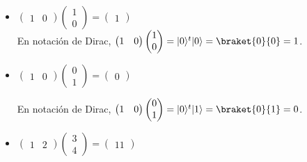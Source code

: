 \documentclass[osajnl,preprint,showpacs,superscriptaddress,10pt]{revtex4-1} %
\DeclarePairedDelimiter\ket{\lvert}{\rangle}
\begin{document}
\begin{itemize}

    \item $\begin{pmatrix}1 & 0\end{pmatrix}\begin{pmatrix}1 \\ 0\end{pmatrix} = \begin{pmatrix}1\end{pmatrix}$ \\
    
    En notación de Dirac, $\begin{pmatrix}1 & 0\end{pmatrix}\begin{pmatrix}1 \\ 0\end{pmatrix} = \ket{0}^t\ket{0} = \braket{0}{0} = 1$.
    
    \item $\begin{pmatrix}1 & 0\end{pmatrix}\begin{pmatrix}0 \\ 1\end{pmatrix} = \begin{pmatrix}0\end{pmatrix}$
    
    En notación de Dirac, $\begin{pmatrix}1 & 0\end{pmatrix}\begin{pmatrix}0 \\ 1\end{pmatrix} = \ket{0}^t\ket{1} = \braket{0}{1} = 0$.
    
    \item $\begin{pmatrix}1 & 2\end{pmatrix}\begin{pmatrix}3 \\ 4\end{pmatrix} = \begin{pmatrix}11\end{pmatrix}$ \\
    

\end{itemize}
\end{document}
